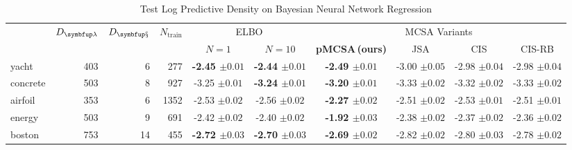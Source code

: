 
\begin{table*}
  \vspace{-0.1in}
  \centering
  \caption{Test Log Predictive Density on Bayesian Neural Network Regression}\label{table:bnn}
  \vspace{-0.05in}
  \setlength{\tabcolsep}{2pt}
  \begin{threeparttable}
  \begin{tabular}{lrrrcccccc}
    \toprule
    & \multicolumn{1}{c}{\multirow{2}{*}{\(D_{\mathcal{\vlambda}}\)}} & \multicolumn{1}{c}{\multirow{2}{*}{\(D_{\mathcal{\vx}}\)}} &  \multicolumn{1}{c}{\multirow{2}{*}{\(N_{\text{train}}\)}} & \multicolumn{2}{c}{\multirow{1}{*}{ELBO}} & \multicolumn{4}{c}{MCSA Variants} \\\cmidrule(lr){5-6}\cmidrule(lr){7-10}
  & & & & {\footnotesize\(N=1\)} & {\footnotesize\(N=10\)} & \multicolumn{1}{c}{\multirow{1}{*}{\footnotesize{\textbf{pMCSA{\scriptsize\,(ours)}}}}} & \multicolumn{1}{c}{\multirow{1}{*}{\footnotesize{JSA}}} & \multicolumn{1}{c}{\multirow{1}{*}{\footnotesize{CIS}}} & \multicolumn{1}{c}{\multirow{1}{*}{\footnotesize{CIS-RB}}}\\
    \midrule
    \textsf{yacht} & 403 & 6 & 277 & {\bf-2.45 {\scriptsize{\(\pm 0.01\)}}} & {\bf-2.44 {\scriptsize{\(\pm 0.01\)}}} & {\bf-2.49 {\scriptsize{\(\pm 0.01\)}}} & {-3.00 {\scriptsize{\(\pm 0.05\)}}} & {-2.98 {\scriptsize{\(\pm 0.04\)}}} & {-2.98 {\scriptsize{\(\pm 0.04\)}}}\\
    \textsf{concrete} & 503 & 8 & 927 & {-3.25 {\scriptsize{\(\pm 0.01\)}}} & {\bf-3.24 {\scriptsize{\(\pm 0.01\)}}} & {\bf-3.20 {\scriptsize{\(\pm 0.01\)}}} & {-3.33 {\scriptsize{\(\pm 0.02\)}}} & {-3.32 {\scriptsize{\(\pm 0.02\)}}} & {-3.33 {\scriptsize{\(\pm 0.02\)}}}\\
    \textsf{airfoil} & 353 & 6 & 1352 & {-2.53 {\scriptsize{\(\pm 0.02\)}}} & {-2.56 {\scriptsize{\(\pm 0.02\)}}} & {\bf-2.27 {\scriptsize{\(\pm 0.02\)}}} & {-2.51 {\scriptsize{\(\pm 0.02\)}}} & {-2.53 {\scriptsize{\(\pm 0.01\)}}} & {-2.51 {\scriptsize{\(\pm 0.01\)}}}\\
    \textsf{energy} & 503 & 9 & 691 & {-2.42 {\scriptsize{\(\pm 0.02\)}}} & {-2.40 {\scriptsize{\(\pm 0.02\)}}} & {\bf-1.92 {\scriptsize{\(\pm 0.03\)}}} & {-2.38 {\scriptsize{\(\pm 0.02\)}}} & {-2.37 {\scriptsize{\(\pm 0.02\)}}} & {-2.36 {\scriptsize{\(\pm 0.02\)}}}\\
    \textsf{boston} & 753 & 14 & 455 & {\bf-2.72 {\scriptsize{\(\pm 0.03\)}}} & {\bf-2.70 {\scriptsize{\(\pm 0.03\)}}} & {\bf-2.69 {\scriptsize{\(\pm 0.02\)}}} & {-2.82 {\scriptsize{\(\pm 0.02\)}}} & {-2.80 {\scriptsize{\(\pm 0.03\)}}} & {-2.78 {\scriptsize{\(\pm 0.02\)}}}\\

\end{tabular}
\end{threeparttable}
\end{table*}
